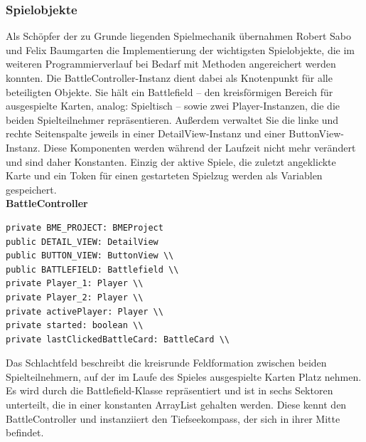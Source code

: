 \subsubsection{Spielobjekte}
Als Schöpfer der zu Grunde liegenden Spielmechanik übernahmen Robert Sabo und Felix Baumgarten die Implementierung der wichtigsten Spielobjekte, die im weiteren Programmierverlauf bei Bedarf mit Methoden angereichert werden konnten.
Die BattleController-Instanz dient dabei als Knotenpunkt für alle beteiligten Objekte. Sie hält ein Battlefield – den kreisförmigen Bereich für ausgespielte Karten, analog: Spieltisch – sowie zwei Player-Instanzen, die die beiden Spielteilnehmer repräsentieren. Außerdem verwaltet Sie die linke und rechte Seitenspalte jeweils in einer DetailView-Instanz und einer ButtonView-Instanz. Diese Komponenten werden während der Laufzeit nicht mehr verändert und sind daher Konstanten. Einzig der aktive Spiele, die zuletzt angeklickte Karte und ein Token für einen gestarteten Spielzug werden als Variablen gespeichert.\\

\textbf{BattleController}
\begin{lstlisting}[frame=single]
private BME_PROJECT: BMEProject 
public DETAIL_VIEW: DetailView 
public BUTTON_VIEW: ButtonView \\
public BATTLEFIELD: Battlefield \\
private Player_1: Player \\
private Player_2: Player \\
private activePlayer: Player \\
private started: boolean \\
private lastClickedBattleCard: BattleCard \\
\end{lstlisting}
Das Schlachtfeld beschreibt die kreisrunde Feldformation zwischen beiden Spielteilnehmern, auf der im Laufe des Spieles ausgespielte Karten Platz nehmen. Es wird durch die Battlefield-Klasse repräsentiert und ist in sechs Sektoren unterteilt, die in einer konstanten ArrayList gehalten werden. Diese kennt den BattleController und instanziiert den Tiefseekompass, der sich in ihrer Mitte befindet.\\

